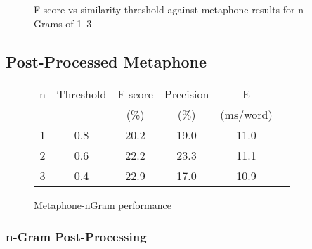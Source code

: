 \documentclass[twocolumn]{article}
\begin{document}

    \begin{figure}[h]
    \caption{F-score vs similarity threshold against metaphone results for n-Grams of 1--3}
    \label{metaNG}
\end{figure}

        \subsection{Post-Processed Metaphone}


\begin{figure}[h]
    \begin{center}
        \begin{tabular}{|c|c|c|c|c|c|}
            \hline
            n & Threshold &  F-score & Precision & E \\
             &  & (\%) &  (\%)&(ms/word)\\

                            \hline\hline
            1 & 0.8  & 20.2 & 19.0 & 11.0\\
            2 & 0.6  & 22.2 & 23.3 & 11.1\\
            3 & 0.4  & 22.9 & 17.0 & 10.9\\

            \hline
        \end{tabular}
    \end{center}
    \caption{Metaphone-nGram performance}
\end{figure}



    \subsubsection{n-Gram Post-Processing}
\end{document}
